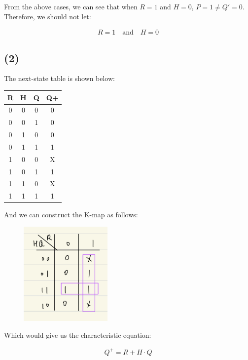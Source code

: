 \documentclass{article}
\begin{document}
From the above cases, we can see that when $R = 1$ and $H = 0$, $P = 1 \neq Q' = 0$.
Therefore, we should not let:

\begin{align*}
    R = 1 \quad \text{and} \quad H = 0
\end{align*}

\subsection*{(2)}

The next-state table is shown below:

\begin{center}
    \begin{tabular}{ |c|c|c||c| } 
        \hline
        \cline{1-4}
        R & H & Q & Q+ \\ 
        \hline
        0 & 0 & 0 & 0 \\ 
        0 & 0 & 1 & 0 \\ 
        0 & 1 & 0 & 0 \\ 
        0 & 1 & 1 & 1 \\ 
        1 & 0 & 0 & X \\
        1 & 0 & 1 & 1 \\ 
        1 & 1 & 0 & X \\ 
        1 & 1 & 1 & 1 \\ 
        \hline
    \end{tabular}
\end{center}

And we can construct the K-map as follows:

\begin{figure}[H]
    \centering
    \includegraphics[width=0.4\textwidth]{3_kmap.jpeg}
\end{figure}

Which would give us the characteristic equation:

\begin{align*}
    Q^+ = R + H \cdot Q
\end{align*}
\end{document}
